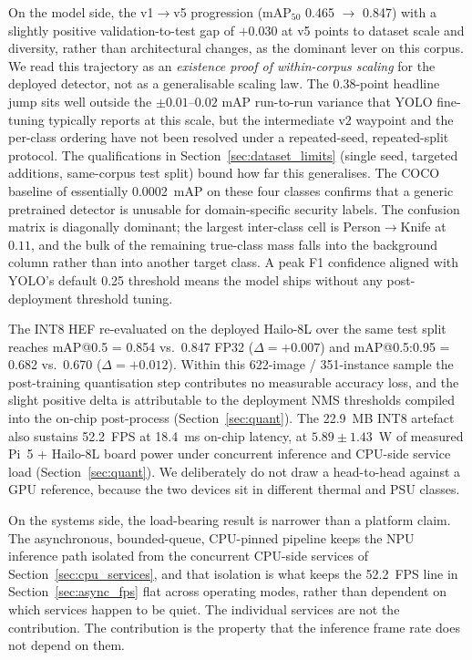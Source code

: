 \documentclass{ieeeaccess}
\begin{document}
On the model side, the v1$\rightarrow$v5 progression (mAP$_{50}$ 0.465 $\rightarrow$ 0.847) with a slightly positive validation-to-test gap of $+0.030$ at v5 points to dataset scale and diversity, rather than architectural changes, as the dominant lever on this corpus. We read this trajectory as an \emph{existence proof of within-corpus scaling} for the deployed detector, not as a generalisable scaling law. The 0.38-point headline jump sits well outside the $\pm 0.01$--$0.02$ mAP run-to-run variance that YOLO fine-tuning typically reports at this scale, but the intermediate v2 waypoint and the per-class ordering have not been resolved under a repeated-seed, repeated-split protocol. The qualifications in Section~\ref{sec:dataset_limits} (single seed, targeted additions, same-corpus test split) bound how far this generalises. The COCO baseline of essentially 0.0002~mAP on these four classes confirms that a generic pretrained detector is unusable for domain-specific security labels. The confusion matrix is diagonally dominant; the largest inter-class cell is Person$\rightarrow$Knife at $0.11$, and the bulk of the remaining true-class mass falls into the background column rather than into another target class. A peak F1 confidence aligned with YOLO's default 0.25 threshold means the model ships without any post-deployment threshold tuning.

The INT8 HEF re-evaluated on the deployed Hailo-8L over the same test split reaches mAP{@}0.5 = 0.854 vs.\ 0.847 FP32 ($\Delta = +0.007$) and mAP{@}0.5:0.95 = 0.682 vs.\ 0.670 ($\Delta = +0.012$). Within this 622-image / 351-instance sample the post-training quantisation step contributes no measurable accuracy loss, and the slight positive delta is attributable to the deployment NMS thresholds compiled into the on-chip post-process (Section~\ref{sec:quant}). The 22.9~MB INT8 artefact also sustains 52.2~FPS at 18.4~ms on-chip latency, at $5.89 \pm 1.43$~W of measured Pi~5 + Hailo-8L board power under concurrent inference and CPU-side service load (Section~\ref{sec:quant}). We deliberately do not draw a head-to-head against a GPU reference, because the two devices sit in different thermal and PSU classes.

On the systems side, the load-bearing result is narrower than a platform claim. The asynchronous, bounded-queue, CPU-pinned pipeline keeps the NPU inference path isolated from the concurrent CPU-side services of Section~\ref{sec:cpu_services}, and that isolation is what keeps the 52.2~FPS line in Section~\ref{sec:async_fps} flat across operating modes, rather than dependent on which services happen to be quiet. The individual services are not the contribution. The contribution is the property that the inference frame rate does not depend on them.
\end{document}

